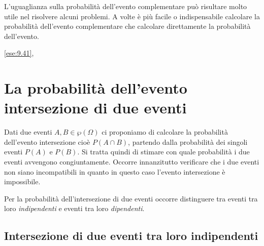 \osservazione L'uguaglianza sulla probabilità dell'evento complementare può 
risultare molto utile nel risolvere alcuni problemi. A volte è più facile o 
indispensabile calcolare la probabilità dell'evento complementare che 
calcolare 
direttamente la probabilità dell'evento.

\ref{ese:9.41}, 

\section{La probabilità dell'evento intersezione di due eventi}
\label{sec:09_intersezione}

Dati due eventi $A,B\in \wp (\Omega )$ ci proponiamo di calcolare la 
probabilità 
dell'evento intersezione cioè $P(A\cap B)$, partendo dalla probabilità dei 
singoli
eventi $ P(A) $ e $ P(B) $. Si tratta quindi di stimare con quale 
probabilità i due eventi avvengono congiuntamente. Occorre innanzitutto 
verificare che i due eventi non siano incompatibili in quanto in questo 
caso 
l'evento intersezione è impossibile.

Per la probabilità dell'intersezione di due eventi occorre distinguere tra 
eventi tra loro \emph{indipendenti} e eventi tra loro \emph{dipendenti}.

\subsection{Intersezione di due eventi tra loro indipendenti}

